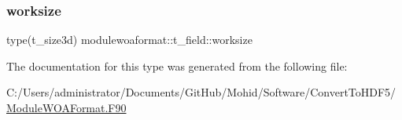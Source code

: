 \mbox{\label{structmodulewoaformat_1_1t__field_a54b99e241e8fc1639f5c64d3549df985}} 
\subsubsection{\texorpdfstring{worksize}{worksize}}
{\footnotesize\ttfamily type(t\+\_\+size3d) modulewoaformat\+::t\+\_\+field\+::worksize\hspace{0.3cm}{\ttfamily [private]}}



The documentation for this type was generated from the following file\+:\begin{DoxyCompactItemize}
\item 
C\+:/\+Users/administrator/\+Documents/\+Git\+Hub/\+Mohid/\+Software/\+Convert\+To\+H\+D\+F5/\mbox{\hyperlink{_module_w_o_a_format_8_f90}{Module\+W\+O\+A\+Format.\+F90}}\end{DoxyCompactItemize}
